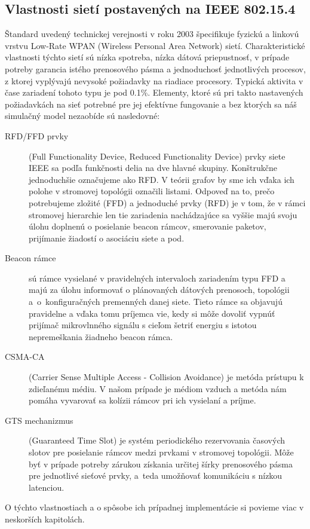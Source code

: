 \subsection{Vlastnosti sietí postavených na IEEE 802.15.4}
\indent\indent Štandard uvedený technickej verejnosti v roku 2003 špecifikuje fyzickú a linkovú vrstvu Low-Rate WPAN (Wireless Personal Area Network) sietí. Charakteristické vlastnosti týchto sietí sú nízka spotreba, nízka dátová priepustnosť, v prípade potreby garancia istého prenosového pásma a jednoduchosť jednotlivých procesov, z ktorej vyplývajú nevysoké požiadavky na riadiace procesory. Typická aktivita v čase zariadení tohoto typu je pod 0.1\%. Elementy, ktoré sú pri takto nastavených požiadavkách na sieť potrebné pre jej efektívne fungovanie a bez ktorých sa náš simulačný model nezaobíde sú nasledovné:
\begin{description}
  \item[RFD/FFD prvky] (Full Functionality Device, Reduced Functionality Device) prvky siete IEEE sa podľa funkčnosti delia na dve hlavné skupiny. Konštrukčne jednoduchšie označujeme ako RFD. V teórii grafov by sme ich vďaka ich polohe v stromovej topológii označili listami. Odpoveď na to, prečo potrebujeme zložité (FFD) a jednoduché prvky (RFD) je v tom, že v rámci stromovej hierarchie len tie zariadenia nachádzajúce sa vyššie majú svoju úlohu doplnenú o posielanie beacon rámcov, smerovanie paketov, prijímanie žiadostí o asociáciu siete a pod.
  \item[Beacon rámce] sú rámce vysielané v pravidelných intervaloch zariadením typu FFD a majú za úlohu informovať o plánovaných dátových prenosoch, topológii a~o~konfiguračných premenných danej siete. Tieto rámce sa objavujú pravidelne a vďaka tomu príjemca vie, kedy si môže dovoliť vypnúť prijímač mikrovlnného signálu s cieľom šetriť energiu s istotou nepremeškania žiadneho beacon rámca.
  \item[CSMA-CA] (Carrier Sense Multiple Access - Collision Avoidance) je metóda prístupu k zdieľanému médiu. V našom prípade je médiom vzduch a metóda nám pomáha vyvarovať sa kolízii rámcov pri ich vysielaní a príjme.
  \item[GTS mechanizmus] (Guaranteed Time Slot) je systém periodického rezervovania časových slotov pre posielanie rámcov medzi prvkami v stromovej topológii. Môže byť v prípade potreby zárukou získania určitej šírky prenosového pásma pre jednotlivé sieťové prvky, a~teda umožňovať komunikáciu s nízkou latenciou.
 \end{description}
\indent\indent O týchto vlastnostiach a o spôsobe ich prípadnej implementácie si povieme viac v neskorších kapitolách.
